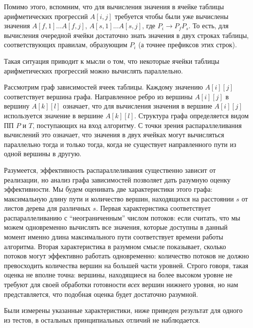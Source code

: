 \documentclass[14pt]{article}
\begin{document}
Помимо этого, вспомним, что для вычисления значения в ячейке таблицы арифметических прогрессий $A[i, j]$ требуется чтобы были уже вычислены значения $A[f, 1] \dots A[f, j]$, $A[s, 1] \dots A[s, j]$, где $P_i \to P_fP_s$. То есть, для вычисления очередной ячейки достаточно знать значения в двух строках таблицы, соответствующих правилам, образующим $P_i$ (а точнее префиксов этих строк).

Такая ситуация приводит к мысли о том, что некоторые ячейки таблицы арифметических прогрессий можно вычислять параллельно.

Рассмотрим граф зависимостей ячеек таблицы. Каждому значению $A[i][j]$ соответствует вершина графа. 
Направленное ребро из вершины $A[i][j]$ в вершину $A[k][l]$ означает, что для вычисления значения 
в вершине $A[i][j]$ используется значение в вершине $A[k][l]$. Структура графа определяется 
видом ПП $P$ и $T$, поступающих на вход алгоритму. 
С точки зрения распараллеливания вычислений это означает, что значения в двух ячейках могут вычисляться 
параллельно тогда и только тогда, когда не существует направленного пути из одной вершины в другую.

Разумеется, эффективность распараллеливания существенно зависит от реализации, но анализ графа зависимостей 
позволяет дать разумную оценку эффективности. Мы будем оценивать две характеристики этого графа: максимальную длину пути и количество вершин, находящихся на расстоянии $s$ от листов дерева для различных $s$. 
Первая характеристика соответствует распараллеливанию с ``неограниченным'' числом потоков: если считать, что мы можем одновременно вычислять все значения, которые доступны в данный момент именно длина максимального пути соответствует времени работы алгоритма. Вторая характеристика в разумном смысле показывает, сколько потоков могут эффективно работать одновременно: количество потоков не должно превосходить количества вершин на большей части уровней. Строго говоря, такая оценка не вполне точна: вершины, находящиеся на более  высоком уровне не требуют для своей обработки готовности \emph{всех} вершин нижнего уровня, но нам представляется, что подобная оценка будет достаточно разумной. 


Были измерены указанные характеристики, ниже приведен результат для одного из тестов, в остальных
принципиальных отличий не наблюдается.
\end{document}

